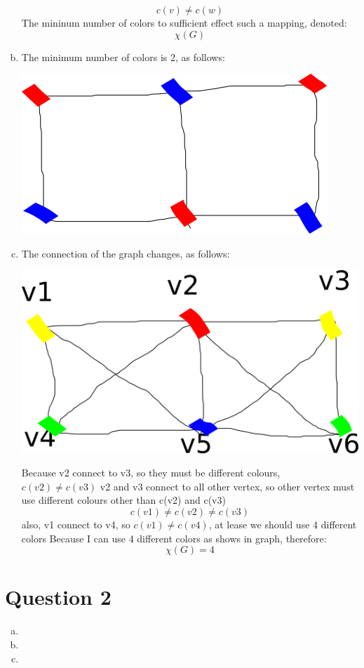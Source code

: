 \documentclass[11pt, a4paper]{article}
\begin{document}
\begin{enumerate}[(a)]
    $$ c(v) \ne c(w) $$
    The mininum number of colors to sufficient effect such a mapping, denoted:
    $$ \chi(G) $$
    \item
    The minimum number of colors is 2, as follows:\\
    \begin{center}
        \includegraphics[scale=0.7]{q1b1}
    \end{center}
    \item
    The connection of the graph changes, as follows:\\
    \begin{center}
        \includegraphics[scale=0.7]{q1c1}
    \end{center}
    Because v2 connect to v3, so they must be different colours, $c(v2) \ne c(v3)$
    v2 and v3 connect to all other vertex, so other vertex must use different colours other than c(v2) and c(v3)
    $$c(v1) \ne c(v2) \ne c(v3)$$
    also, v1 connect to v4, so $c(v1) \ne c(v4)$, at lease we should use 4 different colors
    Because I can use 4 different colors as shows in graph, therefore:
    $$ \chi(G) = 4 $$
\end{enumerate}

\section*{Question 2}
\begin{enumerate}[(a)]
    \item


    \item


    \item


\end{enumerate}
\end{document}
